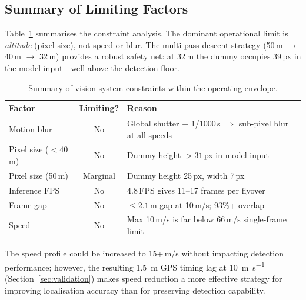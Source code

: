 \FloatBarrier
\subsection{Summary of Limiting Factors}\label{sec:vp:summary}

Table~\ref{tab:limits} summarises the constraint analysis.  The dominant
operational limit is \emph{altitude} (pixel size), not speed or blur.  The
multi-pass descent strategy (50\,m $\to$ 40\,m $\to$ 32\,m) provides a
robust safety net: at 32\,m the dummy occupies 39\,px in the model
input---well above the detection floor.

\begin{table}[ht]
  \centering
  \caption{Summary of vision-system constraints within the operating
  envelope.}\label{tab:limits}
  \begin{tabular}{@{}l c p{6.5cm}@{}}
    \toprule
    \textbf{Factor} & \textbf{Limiting?} & \textbf{Reason} \\
    \midrule
    Motion blur     & No  & Global shutter + 1/1000\,s $\Rightarrow$ sub-pixel blur at all speeds \\
    Pixel size (${<}40$\,m)  & No  & Dummy height $>31$\,px in model input \\
    Pixel size (50\,m)       & Marginal & Dummy height 25\,px, width 7\,px \\
    Inference FPS   & No  & 4.8\,FPS gives 11--17 frames per flyover \\
    Frame gap       & No  & ${\leq}2.1$\,m gap at 10\,m/s; 93\%+ overlap \\
    Speed           & No  & Max 10\,m/s is far below 66\,m/s single-frame limit \\
    \bottomrule
  \end{tabular}
\end{table}

The speed profile could be increased to 15+\,m/s without impacting detection
performance; however, the resulting \SI{1.5}{\metre} GPS timing lag at
\SI{10}{\metre\per\second} (Section~\ref{sec:validation}) makes speed
reduction a more effective strategy for improving localisation accuracy than
for preserving detection capability.

\FloatBarrier
